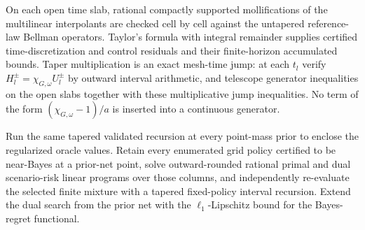 On each open time slab, rational compactly supported mollifications of the multilinear interpolants are checked cell by cell against the untapered reference-law Bellman operators.  Taylor's formula with integral remainder supplies certified time-discretization and control residuals and their finite-horizon accumulated bounds.  Taper multiplication is an exact mesh-time jump: at each \(t_l\) verify \(H_l^\pm=\chi_{G,\omega}U_l^\pm\) by outward interval arithmetic, and telescope generator inequalities on the open slabs together with these multiplicative jump inequalities.  No term of the form \((\chi_{G,\omega}-1)/a\) is inserted into a continuous generator.

Run the same tapered validated recursion at every point-mass prior to enclose the regularized oracle values.  Retain every enumerated grid policy certified to be near-Bayes at a prior-net point, solve outward-rounded rational primal and dual scenario-risk linear programs over those columns, and independently re-evaluate the selected finite mixture with a tapered fixed-policy interval recursion.  Extend the dual search from the prior net with the \(\ell_1\)-Lipschitz bound for the Bayes-regret functional.

